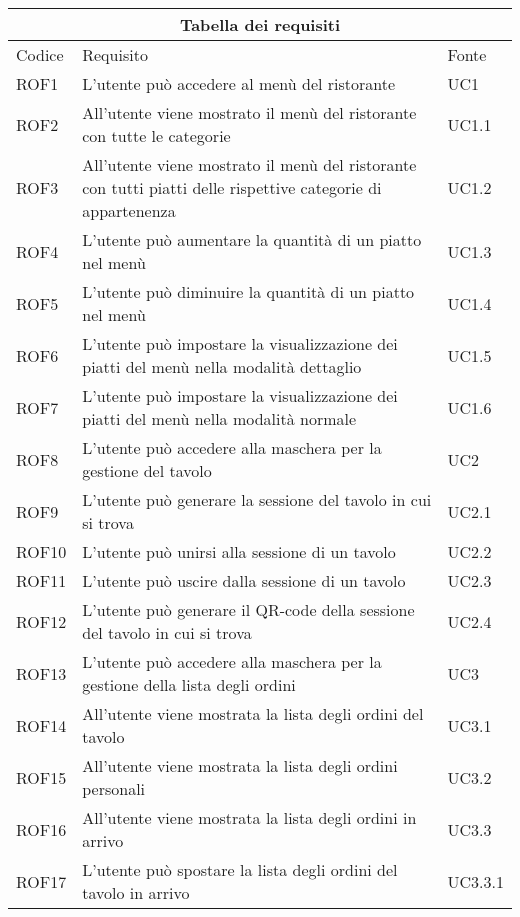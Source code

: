 \begin{center}
    \renewcommand{\arraystretch}{1.5}
    \begin{longtable}{ |p{1.5cm}|p{9cm}|p{1.5cm}|  }
        \hline
        \multicolumn{3}{|c|}{Tabella dei requisiti} \\
        \hline
        Codice&Requisito &Fonte \\
        \hline
        \endhead
        ROF1&L'utente può accedere al menù del ristorante&UC1 \\
        ROF2&All'utente viene mostrato il menù del ristorante con tutte le categorie&UC1.1 \\
        ROF3&All'utente viene mostrato il menù del ristorante con tutti piatti delle rispettive categorie di appartenenza&UC1.2 \\
        ROF4&L'utente può aumentare la quantità di un piatto nel menù&UC1.3 \\
        ROF5&L'utente può diminuire la quantità di un piatto nel menù&UC1.4 \\
        ROF6&L'utente può impostare la visualizzazione dei piatti del menù nella modalità dettaglio&UC1.5 \\
        ROF7&L'utente può impostare la visualizzazione dei piatti del menù nella modalità normale&UC1.6 \\
        ROF8&L'utente può accedere alla maschera per la gestione del tavolo &UC2 \\
        ROF9&L'utente può generare la sessione del tavolo in cui si trova&UC2.1\\
        ROF10&L'utente può unirsi alla sessione di un tavolo&UC2.2 \\
        ROF11&L'utente può uscire dalla sessione di un tavolo&UC2.3\\
        ROF12&L'utente può generare il QR-code della sessione del tavolo in cui si trova&UC2.4\\
        ROF13&L'utente può accedere alla maschera per la gestione della lista degli ordini&UC3 \\
        ROF14&All'utente viene mostrata la lista degli ordini del tavolo&UC3.1 \\
        ROF15&All'utente viene mostrata la lista degli ordini personali &UC3.2 \\
        ROF16&All'utente viene mostrata la lista degli ordini in arrivo&UC3.3 \\
        ROF17&L'utente può spostare la lista degli ordini del tavolo in arrivo &UC3.3.1 \\

\end{longtable}
\end{center}
